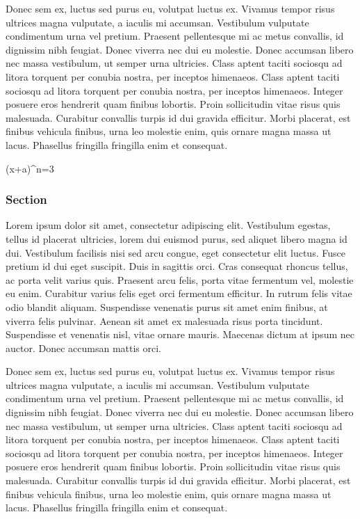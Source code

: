 \documentclass{thesis}
\begin{document}
Donec sem ex, luctus sed purus eu, volutpat luctus ex. Vivamus tempor risus ultrices magna vulputate, a iaculis mi accumsan. Vestibulum vulputate condimentum urna vel pretium. Praesent pellentesque mi ac metus convallis, id dignissim nibh feugiat. Donec viverra nec dui eu molestie. Donec accumsan libero nec massa vestibulum, ut semper urna ultricies. Class aptent taciti sociosqu ad litora torquent per conubia nostra, per inceptos himenaeos. Class aptent taciti sociosqu ad litora torquent per conubia nostra, per inceptos himenaeos. Integer posuere eros hendrerit quam finibus lobortis. Proin sollicitudin vitae risus quis malesuada. Curabitur convallis turpis id dui gravida efficitur. Morbi placerat, est finibus vehicula finibus, urna leo molestie enim, quis ornare magna massa ut lacus. Phasellus fringilla fringilla enim et consequat.


\begin{thesisequation}{2}
	(x+a)^n=3
\end{thesisequation}

\subsubsection{Section}
Lorem ipsum dolor sit amet, consectetur adipiscing elit. Vestibulum egestas, tellus id placerat ultricies, lorem dui euismod purus, sed aliquet libero magna id dui. Vestibulum facilisis nisi sed arcu congue, eget consectetur elit luctus. Fusce pretium id dui eget suscipit. Duis in sagittis orci. Cras consequat rhoncus tellus, ac porta velit varius quis. Praesent arcu felis, porta vitae fermentum vel, molestie eu enim. Curabitur varius felis eget orci fermentum efficitur. In rutrum felis vitae odio blandit aliquam. Suspendisse venenatis purus sit amet enim finibus, at viverra felis pulvinar. Aenean sit amet ex malesuada risus porta tincidunt. Suspendisse et venenatis nisl, vitae ornare mauris. Maecenas dictum at ipsum nec auctor. Donec accumsan mattis orci. 

Donec sem ex, luctus sed purus eu, volutpat luctus ex. Vivamus tempor risus ultrices magna vulputate, a iaculis mi accumsan. Vestibulum vulputate condimentum urna vel pretium. Praesent pellentesque mi ac metus convallis, id dignissim nibh feugiat. Donec viverra nec dui eu molestie. Donec accumsan libero nec massa vestibulum, ut semper urna ultricies. Class aptent taciti sociosqu ad litora torquent per conubia nostra, per inceptos himenaeos. Class aptent taciti sociosqu ad litora torquent per conubia nostra, per inceptos himenaeos. Integer posuere eros hendrerit quam finibus lobortis. Proin sollicitudin vitae risus quis malesuada. Curabitur convallis turpis id dui gravida efficitur. Morbi placerat, est finibus vehicula finibus, urna leo molestie enim, quis ornare magna massa ut lacus. Phasellus fringilla fringilla enim et consequat.
\end{document}
